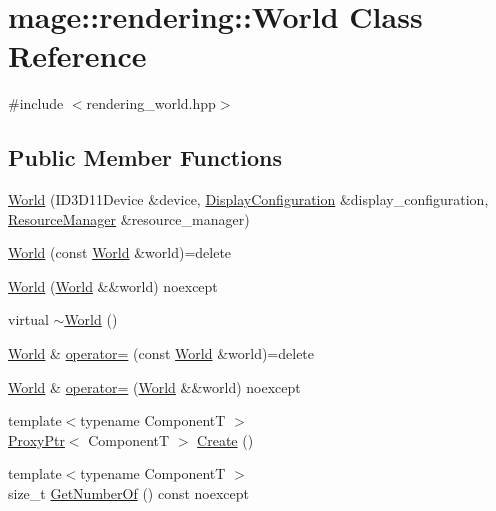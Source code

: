 \hypertarget{classmage_1_1rendering_1_1_world}{}\section{mage\+:\+:rendering\+:\+:World Class Reference}
\label{classmage_1_1rendering_1_1_world}


{\ttfamily \#include $<$rendering\+\_\+world.\+hpp$>$}

\subsection*{Public Member Functions}
\begin{DoxyCompactItemize}
\item 
\hyperlink{classmage_1_1rendering_1_1_world_af9fc38564ff93abc8c760ab15f1faffe}{World} (I\+D3\+D11\+Device \&device, \hyperlink{classmage_1_1rendering_1_1_display_configuration}{Display\+Configuration} \&display\+\_\+configuration, \hyperlink{classmage_1_1rendering_1_1_resource_manager}{Resource\+Manager} \&resource\+\_\+manager)
\item 
\hyperlink{classmage_1_1rendering_1_1_world_a984d1e05e0bd1dc476db76339eefc2ec}{World} (const \hyperlink{classmage_1_1rendering_1_1_world}{World} \&world)=delete
\item 
\hyperlink{classmage_1_1rendering_1_1_world_ab21bdb575e6b0c2106390ed35763a831}{World} (\hyperlink{classmage_1_1rendering_1_1_world}{World} \&\&world) noexcept
\item 
virtual \hyperlink{classmage_1_1rendering_1_1_world_a97d321ddb178e24758bb40d74968ac51}{$\sim$\+World} ()
\item 
\hyperlink{classmage_1_1rendering_1_1_world}{World} \& \hyperlink{classmage_1_1rendering_1_1_world_aff83cf89dc28c141ca7b7a0cbc28e2ae}{operator=} (const \hyperlink{classmage_1_1rendering_1_1_world}{World} \&world)=delete
\item 
\hyperlink{classmage_1_1rendering_1_1_world}{World} \& \hyperlink{classmage_1_1rendering_1_1_world_a7f44f10905070997553a7c7ad90ddcb2}{operator=} (\hyperlink{classmage_1_1rendering_1_1_world}{World} \&\&world) noexcept
\item 
{\footnotesize template$<$typename ComponentT $>$ }\\\hyperlink{classmage_1_1_proxy_ptr}{Proxy\+Ptr}$<$ ComponentT $>$ \hyperlink{classmage_1_1rendering_1_1_world_a2b653a260b5a74f579efb1416f0e2c7d}{Create} ()
\item 
{\footnotesize template$<$typename ComponentT $>$ }\\size\+\_\+t \hyperlink{classmage_1_1rendering_1_1_world_a3f5ff2ff451a90af7071bddf9d226618}{Get\+Number\+Of} () const noexcept

\end{DoxyCompactItemize}
